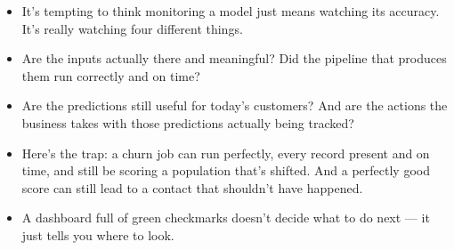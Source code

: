 \documentclass[11pt,a4paper]{article}
\begin{document}
\begin{examplebox}[title after break={SPOKEN SCRIPT --- slide 16 continued}]
\begin{itemize}
\item It's tempting to think monitoring a model just means watching its accuracy. It's really watching four different things.
\item Are the inputs actually there and meaningful? Did the pipeline that produces them run correctly and on time?
\item Are the predictions still useful for today's customers? And are the actions the business takes with those predictions actually being tracked?
\item Here's the trap: a churn job can run perfectly, every record present and on time, and still be scoring a population that's shifted. And a perfectly good score can still lead to a contact that shouldn't have happened.
\item A dashboard full of green checkmarks doesn't decide what to do next — it just tells you where to look.
\end{itemize}
\end{examplebox}
\par\noindent{\scriptsize\textcolor{teal!60!black}{Reading anchor: Bass, Ch. 11 / §14.1.5}}
\clearpage
\end{document}
